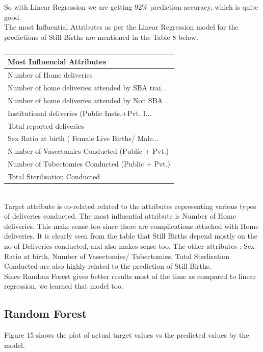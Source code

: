 \documentclass[12pt]{article}
\begin{document}
So with Linear Regression we are getting 92\% prediction accuracy, which is quite good.\\


The most Influential Attributes as per the Linear Regression model for the predictions of Still Births are mentioned in the Table 8 below.\\

\begin{table}[!h]
\centering
\caption{}
\vspace{5pt}
\begin{tabular}{|l|}
\hline
\textbf{Most Influencial Attributes}              \\ \hline
Number of Home deliveries                         \\
Number of home deliveries attended by SBA trai... \\
Number of home deliveries attended by Non SBA ... \\
Institutional deliveries (Public Insts.+Pvt. I... \\
Total reported deliveries                         \\
Sex Ratio at birth ( Female Live Births/ Male... \\
Number of Vasectomies Conducted (Public + Pvt.)   \\
Number of Tubectomies Conducted (Public + Pvt.)   \\
Total Sterilisation Conducted                    \\ \hline
\end{tabular}
\end{table}
\\
Target attribute is co-related related to the attributes representing various types of deliveries conducted. The most influential attribute is Number of Home deliveries. This make sense too since there are complications attached with Home deliveries. It is clearly seen from the table that Still Births depend mostly on the no of Deliveries conducted, and also makes sense too. The other attributes : Sex Ratio at birth, Number of Vasectomies/ Tubectomies, Total Sterlisation Conducted are also highly related to the prediction of Still Births.\\

Since Random Forest gives better results most of the time as compared to linear regression, we learned that model too.\\
\newpage
\subsection{Random Forest}
Figure 15 shows the plot of actual target values vs the predicted values by the model.\\
\end{document}
